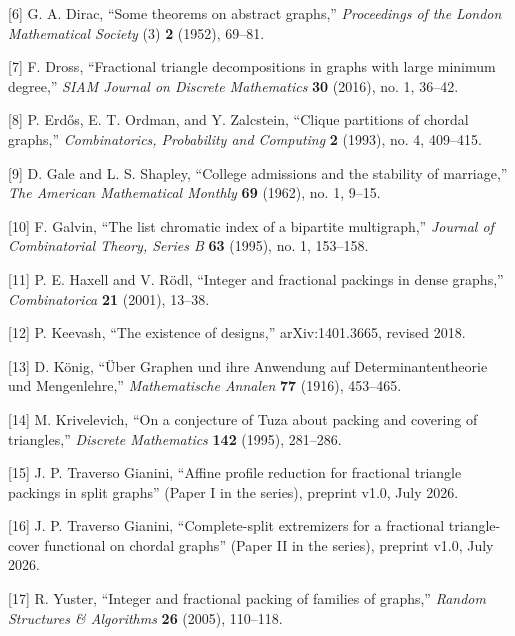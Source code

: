 \documentclass[
  11pt,
]{article}
\begin{document}
{[}6{]} G. A. Dirac, ``Some theorems on abstract graphs,''
\emph{Proceedings of the London Mathematical Society} (3) \textbf{2}
(1952), 69--81.

{[}7{]} F. Dross, ``Fractional triangle decompositions in graphs with
large minimum degree,'' \emph{SIAM Journal on Discrete Mathematics}
\textbf{30} (2016), no. 1, 36--42.

{[}8{]} P. Erdős, E. T. Ordman, and Y. Zalcstein, ``Clique partitions of
chordal graphs,'' \emph{Combinatorics, Probability and Computing}
\textbf{2} (1993), no. 4, 409--415.

{[}9{]} D. Gale and L. S. Shapley, ``College admissions and the
stability of marriage,'' \emph{The American Mathematical Monthly}
\textbf{69} (1962), no. 1, 9--15.

{[}10{]} F. Galvin, ``The list chromatic index of a bipartite
multigraph,'' \emph{Journal of Combinatorial Theory, Series B}
\textbf{63} (1995), no. 1, 153--158.

{[}11{]} P. E. Haxell and V. Rödl, ``Integer and fractional packings in
dense graphs,'' \emph{Combinatorica} \textbf{21} (2001), 13--38.

{[}12{]} P. Keevash, ``The existence of designs,'' arXiv:1401.3665,
revised 2018.

{[}13{]} D. König, ``Über Graphen und ihre Anwendung auf
Determinantentheorie und Mengenlehre,'' \emph{Mathematische Annalen}
\textbf{77} (1916), 453--465.

{[}14{]} M. Krivelevich, ``On a conjecture of Tuza about packing and
covering of triangles,'' \emph{Discrete Mathematics} \textbf{142}
(1995), 281--286.

{[}15{]} J. P. Traverso Gianini, ``Affine profile reduction for
fractional triangle packings in split graphs'' (Paper I in the series),
preprint v1.0, July 2026.

{[}16{]} J. P. Traverso Gianini, ``Complete-split extremizers for a
fractional triangle-cover functional on chordal graphs'' (Paper II in
the series), preprint v1.0, July 2026.

{[}17{]} R. Yuster, ``Integer and fractional packing of families of
graphs,'' \emph{Random Structures \& Algorithms} \textbf{26} (2005),
110--118.
\end{document}
